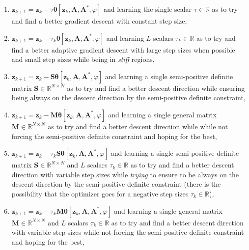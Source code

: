 \begin{enumerate}
  \item $\boldsymbol{z}_{k+1} = \boldsymbol{z}_k - \tau\boldsymbol{\theta}[\boldsymbol{z}_k,\boldsymbol{A},\boldsymbol{A^*},\varphi]$ 
  and learning the single scalar $\tau \in \mathbb{R}$ as to try and find a better gradient descent with constant step size,
  \item $\boldsymbol{z}_{k+1} = \boldsymbol{z}_k - \tau_k\boldsymbol{\theta}[\boldsymbol{z}_k,\boldsymbol{A},\boldsymbol{A^*},\varphi]$
  and learning $L$ scalars $\tau_k\in\mathbb{R}$ as to try and find a better adaptive gradient descent with large step sizes when possible 
  and small step sizes while being in \emph{stiff} regions, 
  \item $\boldsymbol{z}_{k+1} = \boldsymbol{z}_k - \boldsymbol{S}\boldsymbol{\theta}[\boldsymbol{z}_k,\boldsymbol{A},\boldsymbol{A^*},\varphi]$
  and learning a single semi-positive definite matrix $\boldsymbol{S}\in \mathbb{R}^{N \times N}$ as to try and find a better descent direction while 
  ensuring being always on the descent direction by the semi-positive definite constraint,
  \item $\boldsymbol{z}_{k+1} = \boldsymbol{z}_k - \boldsymbol{M}\boldsymbol{\theta}[\boldsymbol{z}_k,\boldsymbol{A},\boldsymbol{A^*},\varphi]$
  and learning a single general matrix $\boldsymbol{M}\in \mathbb{R}^{N \times N}$ as to try and find a better descent direction while 
  while not forcing the semi-positive definite constraint and hoping for the best,
  \item $\boldsymbol{z}_{k+1} = \boldsymbol{z}_k - \tau_k\boldsymbol{S}\boldsymbol{\theta}[\boldsymbol{z}_k,\boldsymbol{A},\boldsymbol{A^*},\varphi]$
  and learning a single semi-positive definite matrix $\boldsymbol{S}\in \mathbb{R}^{N \times N}$ and $L$ scalars $\tau_k \in \mathbb{R}$ as to try and find a 
  better descent direction with variable step sizes while \emph{trying} to ensure to be always on the descent direction by the 
  semi-positive definite constraint (there is the possibility that the optimizer goes for a negative step sizes $\tau_k \in \mathbb{R}$), 
  \item $\boldsymbol{z}_{k+1} = \boldsymbol{z}_k - \tau_k\boldsymbol{M}\boldsymbol{\theta}[\boldsymbol{z}_k,\boldsymbol{A},\boldsymbol{A^*},\varphi]$
  and learning a single general matrix $\boldsymbol{M}\in \mathbb{R}^{N \times N}$ and $L$ scalars $\tau_k \in \mathbb{R}$ as to try and find a 
  better descent direction with variable step sizes while not forcing the semi-positive definite constraint and hoping for the best,

\end{enumerate}
